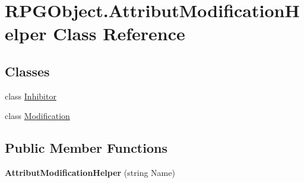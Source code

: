 \hypertarget{class_r_p_g_object_1_1_attribut_modification_helper}{}\section{R\+P\+G\+Object.\+Attribut\+Modification\+Helper Class Reference}
\label{class_r_p_g_object_1_1_attribut_modification_helper}
\subsection*{Classes}
\begin{DoxyCompactItemize}
\item 
class \hyperlink{class_r_p_g_object_1_1_attribut_modification_helper_1_1_inhibitor}{Inhibitor}
\item 
class \hyperlink{class_r_p_g_object_1_1_attribut_modification_helper_1_1_modification}{Modification}
\end{DoxyCompactItemize}
\subsection*{Public Member Functions}
\begin{DoxyCompactItemize}
\item 
\hypertarget{class_r_p_g_object_1_1_attribut_modification_helper_a77b155c4033c277b394c6d6fa9017788}{}{\bfseries Attribut\+Modification\+Helper} (string Name)\label{class_r_p_g_object_1_1_attribut_modification_helper_a77b155c4033c277b394c6d6fa9017788}

\end{DoxyCompactItemize}
